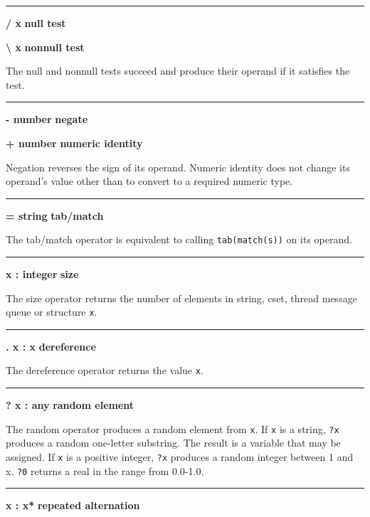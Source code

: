 \bigskip\hrule\vspace{0.1cm}
\noindent
{\bf / x } \hfill {\bf null test}

\noindent
{\bf {\textbackslash} x } \hfill {\bf nonnull test}

\noindent
The null and nonnull tests succeed
and produce their operand if it satisfies the test.

\bigskip\hrule\vspace{0.1cm}
\noindent
{\bf {}- number } \hfill {\bf negate}

\noindent
{\bf + number } \hfill {\bf numeric identity}

\noindent
Negation reverses the sign of its operand. Numeric identity does not
change its operand's value other than to convert to a
required numeric type.

\bigskip\hrule\vspace{0.1cm}
\noindent
{\bf = string } \hfill {\bf tab/match}

\noindent
{}The tab/match operator is equivalent to calling
\texttt{tab(match(s))} on its operand.

\bigskip\hrule\vspace{0.1cm}
\noindent
{\bf * x : integer } \hfill {\bf size}

\noindent
The size operator returns the number of elements in
string, cset, thread message queue or structure \texttt{x}.

\bigskip\hrule\vspace{0.1cm}
\noindent
{\bf . x : x } \hfill {\bf dereference}

\noindent
The dereference operator returns the value
\texttt{x}.

\bigskip\hrule\vspace{0.1cm}
\noindent
{\bf ? x : any } \hfill {\bf random element}

\noindent
The random operator produces a random element
from \texttt{x}. If \texttt{x} is a string, \texttt{?x} produces a
random one-letter substring. The result is a variable that may be
assigned. If \texttt{x} is a positive integer, \texttt{?x} produces a
random integer between 1 and x.  \texttt{?0} returns a real in the
range from 0.0-1.0.

\bigskip\hrule\vspace{0.1cm}
\noindent
{\bf {\textbar} x : x* } \hfill {\bf repeated alternation}

